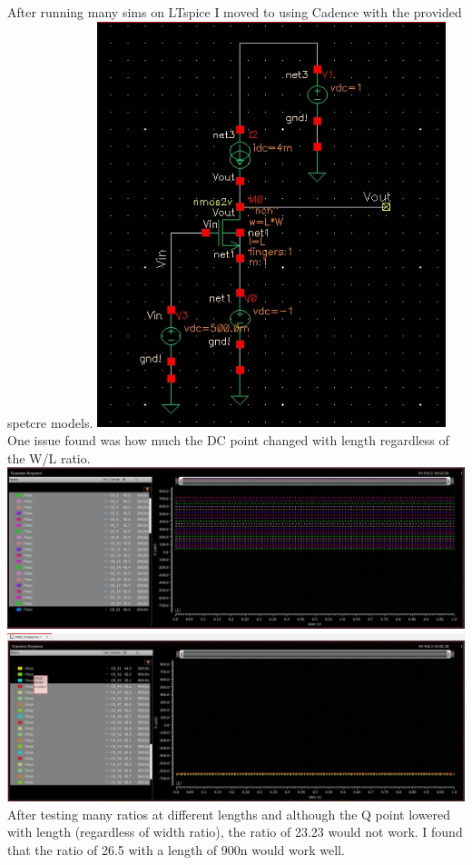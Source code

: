 \documentclass[10pt,a4paper]{article}
\begin{document}
After running many sims on LTspice I moved to using Cadence with the provided spetcre models.
\includegraphics[width=4in]{images/Problem4design.png} \\

One issue found was how much the DC point changed with length regardless of the W/L ratio.
\includegraphics[width=6in]{images/Problem4lowerlength.png} \\
\includegraphics[width=6in]{images/Problem4higherlength.png} \\
After testing many ratios at different lengths and although the Q point lowered with length (regardless of width ratio), the ratio of 23.23 would not work.
I found that the ratio of 26.5 with a length of 900n would work well.\\
\end{document}
